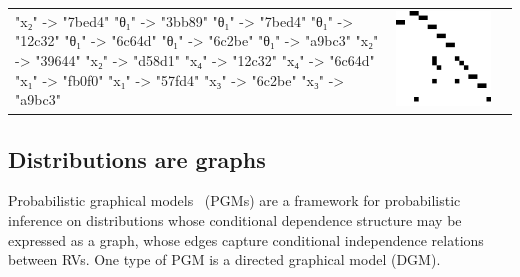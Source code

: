 \documentclass[11pt]{article}
\begin{document}
\begin{table}[H]
\begin{tabular}{lcc}
\begin{adjustbox}{minipage={.25\textwidth}, height=0.14\textwidth, margin*=0cm 0cm 0cm 0.1cm}
{    "x₂" -> "7bed4"
    "θ₁" -> "3bb89"
    "θ₁" -> "7bed4"
    "θ₁" -> "12c32"
    "θ₁" -> "6c64d"
    "θ₁" -> "6c2be"
    "θ₁" -> "a9bc3"
    "x₂" -> "39644"
    "x₂" -> "d58d1"
    "x₄" -> "12c32"
    "x₄" -> "6c64d"
    "x₁" -> "fb0f0"
    "x₁" -> "57fd4"
    "x₃" -> "6c2be"
    "x₃" -> "a9bc3"
    } \end{adjustbox} &
            \begin{adjustbox}{minipage={.15\textwidth}, height=0.14\textwidth, margin*=-0.2cm 0cm 0cm 0.5cm}
            \includegraphics[scale=0.15]{../clipart/adj_prog.png}
            \end{adjustbox}
        \end{tabular}
    \end{table}
    \egroup

    \pagebreak\subsection{Distributions are graphs}\label{sec:distributions-graphs}

    Probabilistic graphical models~\cite{jordan2003introduction,koller2009probabilistic} (PGMs) are a framework for probabilistic inference on distributions whose conditional dependence structure may be expressed as a graph, whose edges capture conditional independence relations between RVs. One type of PGM is a directed graphical model (DGM).
\end{document}
